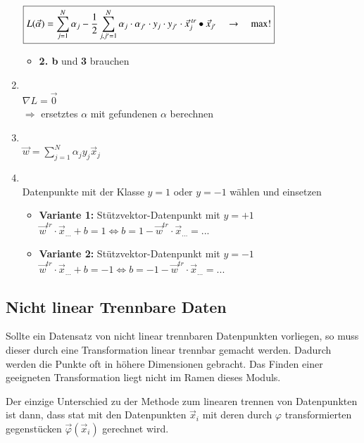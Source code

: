 \begin{enumerate}
        $\boxed{L(\vec{\alpha})=\sum_{j=1}^N\alpha_j-\frac{1}{2}\sum_{j,j'=1}^N\alpha_j \cdot \alpha_{j'} \cdot \space y_j \cdot y_{j'} \cdot \space \vec{x}_j^{\text{ $tr$}} \bullet  \vec{x}_{j'}\quad\to\quad\max!}$
        \begin{itemize}
            \item \textbf{2. b} und \textbf{3} brauchen
        \end{itemize}
    \item {}\\
            $\boxed{\nabla L = \vec{0}}$\\
            $\Rightarrow$ ersetztes $\alpha$ mit gefundenen $\alpha$ berechnen 
    \item {}\\
        $\boxed{\vec{w}=\sum_{j=1}^N\alpha_jy_j\vec{x}_j}$
    \item {}\\
        Datenpunkte mit der Klasse $y = 1$ oder $y = -1$ wählen und einsetzen
        \begin{itemize}
            \item \textbf{Variante 1:} Stützvektor-Datenpunkt mit $y = +1$\\
                $\boxed{\vec{w}^{tr}\cdot\vec{x}_{...} + b = 1} \Leftrightarrow  \boxed{b = 1 -\vec{w}^{tr}\cdot\vec{x}_{...} = ...}$
            \item \textbf{Variante 2:} Stützvektor-Datenpunkt mit $y = -1$\\
                $\boxed{\vec{w}^{tr}\cdot\vec{x}_{...} + b = -1} \Leftrightarrow  \boxed{b = -1 -\vec{w}^{tr}\cdot\vec{x}_{...} = ...}$
        \end{itemize}
\end{enumerate}


\subsection{Nicht linear Trennbare Daten}
Sollte ein Datensatz von nicht linear trennbaren Datenpunkten vorliegen, so muss dieser durch eine Transformation linear trennbar gemacht werden.
Dadurch werden die Punkte oft in höhere Dimensionen gebracht.
Das Finden einer geeigneten Transformation liegt nicht im Ramen dieses Moduls.

Der einzige Unterschied zu der Methode zum linearen trennen von Datenpunkten ist dann, dass stat mit den Datenpunkten $\vec{x}_i$ mit deren durch $\varphi$ transformierten gegenstücken $\vec{\varphi}(\vec{x}_i)$ gerechnet wird.

